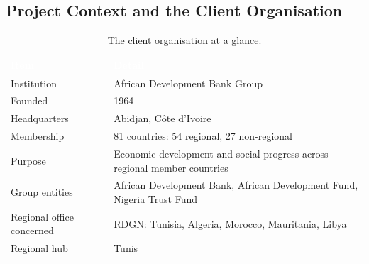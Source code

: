 \subsection{Project Context and the Client Organisation}


\begin{table}[h]
\centering
\caption{The client organisation at a glance.}
\label{tab:afdb}
\begin{tabular}{|p{}|p{}|}
\hline
\rowcolor{myblue}\textcolor{white}{\textbf{Item}} & \textcolor{white}{\textbf{Detail}} \\
\hline
Institution & African Development Bank Group \\ \hline
Founded & 1964 \\ \hline
Headquarters & Abidjan, C\^ote d'Ivoire \\ \hline
Membership & 81 countries: 54 regional, 27 non-regional \\ \hline
Purpose & Economic development and social progress across regional member countries \\ \hline
Group entities & African Development Bank, African Development Fund, Nigeria Trust Fund \\ \hline
Regional office concerned & RDGN: Tunisia, Algeria, Morocco, Mauritania, Libya \\ \hline
Regional hub & Tunis \\ \hline
\end{tabular}
\end{table}

